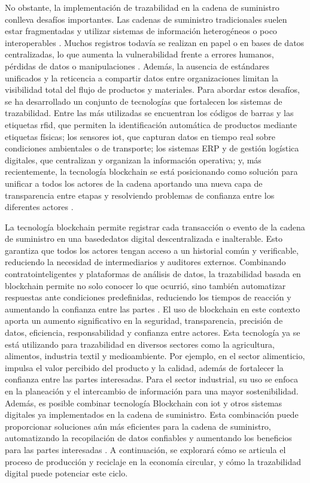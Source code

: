No obstante, la implementación de trazabilidad en la cadena de suministro conlleva desafíos importantes. Las cadenas de suministro tradicionales suelen estar fragmentadas y utilizar sistemas de información heterogéneos o poco interoperables \cite{torres2022tendencias}. Muchos registros todavía se realizan en papel o en bases de datos centralizadas, lo que aumenta la vulnerabilidad frente a errores humanos, pérdidas de datos o manipulaciones \cite{bartolomeo2020introduccion}. Además, la ausencia de estándares unificados y la reticencia a compartir datos entre organizaciones limitan la visibilidad total del flujo de productos y materiales. Para abordar estos desafíos, se ha desarrollado un conjunto de tecnologías que fortalecen los sistemas de trazabilidad. Entre las más utilizadas se encuentran los códigos de barras y las etiquetas \acrshort{rfid}, que permiten la identificación automática de productos mediante etiquetas físicas; los sensores \acrshort{iot}, que capturan datos en tiempo real sobre condiciones ambientales o de transporte; los sistemas ERP y de gestión logística digitales, que centralizan y organizan la información operativa; y, más recientemente, la tecnología blockchain se está posicionando como solución para unificar a todos los actores de la cadena aportando una nueva capa de transparencia entre etapas y resolviendo problemas de confianza entre los diferentes actores \cite{wong2024enhancing}.

La tecnología blockchain permite registrar cada transacción o evento de la cadena de suministro en una \gls{basededatos} digital descentralizada e inalterable. Esto garantiza que todos los actores tengan acceso a un historial común y verificable, reduciendo la necesidad de intermediarios y auditores externos. Combinando \glspl{contratointeligente} y plataformas de análisis de datos, la trazabilidad basada en blockchain permite no solo conocer lo que ocurrió, sino también automatizar respuestas ante condiciones predefinidas, reduciendo los tiempos de reacción y aumentando la confianza entre las partes \cite{wong2024enhancing}. El uso de blockchain en este contexto aporta un aumento significativo en la seguridad, transparencia, precisión de datos, eficiencia, responsabilidad y confianza entre actores. Esta tecnología ya se está utilizando para trazabilidad en diversos sectores como la agricultura, alimentos, industria textil y medioambiente. Por ejemplo, en el sector alimenticio, impulsa el valor percibido del producto y la calidad, además de fortalecer la confianza entre las partes interesadas. Para el sector industrial, su uso se enfoca en la planeación y el intercambio de información para una mayor \gls{sostenibilidad}. Además, es posible combinar tecnología Blockchain con \acrshort{iot} y otros sistemas digitales ya implementados en la cadena de suministro. Esta combinación puede proporcionar soluciones aún más eficientes para la cadena de suministro, automatizando la recopilación de datos confiables y aumentando los beneficios para las partes interesadas \cite{wong2024enhancing}. A continuación, se explorará cómo se articula el proceso de producción y reciclaje en la economía circular, y cómo la trazabilidad digital puede potenciar este ciclo.

